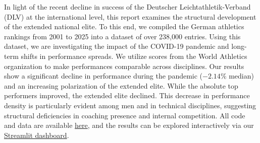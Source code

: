 In light of the recent decline in success of the Deutscher Leichtathletik-Verband (DLV) at the international level, this report examines the structural development of the extended national elite.
To this end, we compiled the German athletics rankings from 2001 to 2025 into a dataset of over 238,000 entries.
Using this dataset, we are investigating the impact of the COVID-19 pandemic and long-term shifts in performance spreads.
We utilize scores from the World Athletics organization to make performances comparable across disciplines.
Our results show a significant decline in performance during the pandemic ($-2.14\%$ median) and an increasing polarization of the extended elite.
While the absolute top performers improved, the extended elite declined.
This decrease in performance density is particularly evident among men and in technical disciplines, suggesting structural deficiencies in coaching presence and internal competition.
All code and data are available \href{https://github.com/maxwernz/Data-Literacy}{here}, and the results can be explored interactively via our \href{https://data-literacy-german-athletics.streamlit.app/}{Streamlit dashboard}.
